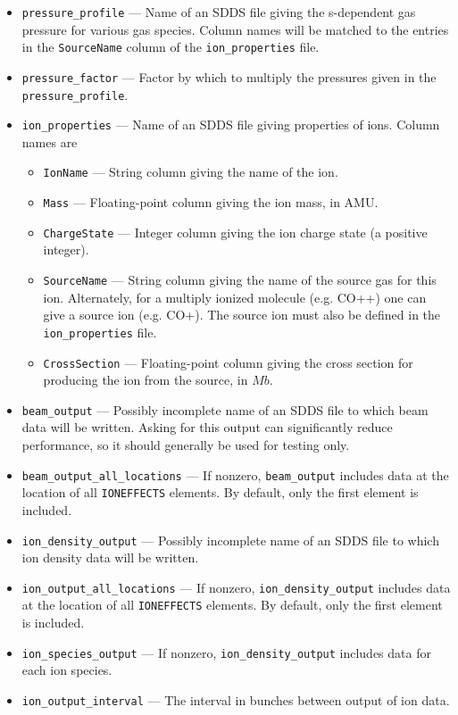 \documentclass[11pt]{article}
\begin{document}
\begin{itemize}
\item \verb|pressure_profile| --- Name of an SDDS file giving the s-dependent gas pressure for
  various gas species. Column names will be matched to the entries in the \verb|SourceName| column of the
  \verb|ion_properties| file.
\item \verb|pressure_factor| --- Factor by which to multiply the pressures given in the \verb|pressure_profile|.
\item \verb|ion_properties| --- Name of an SDDS file giving properties of ions. Column names are
  \begin{itemize}
  \item \verb|IonName| --- String column giving the name of the ion.
  \item \verb|Mass| --- Floating-point column giving the ion mass, in AMU.
  \item \verb|ChargeState| --- Integer column giving the ion charge state (a positive integer).
  \item \verb|SourceName| --- String column giving the name of the source gas for this ion.
    Alternately, for a multiply ionized molecule (e.g. CO++) one can give a source ion (e.g. CO+).  The source ion must also be defined in the \verb|ion_properties| file.
  \item \verb|CrossSection| --- Floating-point column giving the cross section for producing the ion from the source, in $Mb$.
  \end{itemize}
\item \verb|beam_output| --- Possibly incomplete name of an SDDS file to which beam data will be written.
  Asking for this output can significantly reduce performance, so it should generally be used for testing only.
\item \verb|beam_output_all_locations| --- If nonzero, \verb|beam_output| includes data at the location of
  all \verb|IONEFFECTS| elements. By default, only the first element is included.
\item \verb|ion_density_output| --- Possibly incomplete name of an SDDS file to which ion density data will be written.
\item \verb|ion_output_all_locations| --- If nonzero, \verb|ion_density_output| includes data at the location of
  all \verb|IONEFFECTS| elements. By default, only the first element is included.
\item \verb|ion_species_output| --- If nonzero, \verb|ion_density_output| includes data for each ion species.
\item \verb|ion_output_interval| --- The interval in bunches between output of ion data.

\end{itemize}
\end{document}
